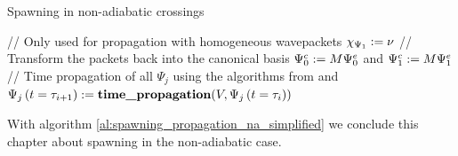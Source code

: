 \begin{chapter}{Spawning in non-adiabatic crossings}
\begin{algorithm}
\begin{algorithmic}
      \STATE // Only used for propagation with homogeneous wavepackets
      \STATE $\chi_{\Psi_1} := \nu$
      \STATE // Transform the packets back into the canonical basis
      \STATE $\Psi^c_0 := M \Psi^e_0$ and $\Psi^c_1 := M \Psi^e_1$
    \ENDIF
    \STATE // Time propagation of all $\Psi_j$ using the algorithms from \cite{FGL_semiclassical_dynamics} and \cite{BGH_nonadibatic_algorithms}
       \STATE $\Psi_j\left( t=\tau_{i+1} \right) := \textbf{time\_propagation}(V, \Psi_j\left( t=\tau_i \right))$
    \ENDFOR
  \ENDFOR
\end{algorithmic}
\end{algorithm}

With algorithm \ref{al:spawning_propagation_na_simplified} we conclude this
chapter about spawning in the non-adiabatic case.

\end{chapter}
